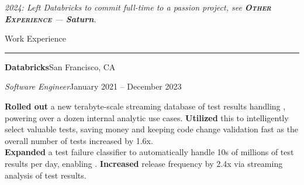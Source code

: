 












  \emph{2024: Left Databricks to commit full-time to a passion project, see \textbf{\scshape{}Other Experience} --- \textbf{Saturn}.}

  \vspace{5pt}

  {\sectionfont Work Experience\vspace{2pt}\hrule}

  \vspace{5pt}
  \textbf{Databricks}\quad{}\hfill San Francisco, CA
  \begin{adjustwidth}{10pt}{}
    \emph{Software Engineer}\hfill January 2021 -- December 2023

    \textbf{Rolled out} a new terabyte-scale streaming database of test results handling , powering over a dozen internal analytic use cases.
    \textbf{Utilized} this to intelligently select valuable tests, saving money and keeping code change validation fast  as the overall number of tests increased by 1.6x.\\
    \textbf{Expanded} a test failure classifier to automatically handle 10s of millions of test results per day, enabling .
    \textbf{Increased} release frequency by 2.4x via streaming analysis of test results.
  \end{adjustwidth}

